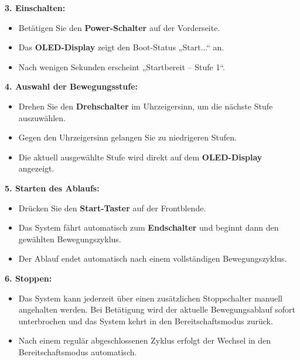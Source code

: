 \documentclass[a4paper,12pt]{report}
\begin{document}
		
		
		\noindent\textbf{3. Einschalten:}
		
		\begin{itemize}[leftmargin=1.5em]
		\item Betätigen Sie den \textbf{Power-Schalter} auf der Vorderseite. 
		\item Das \textbf{OLED-Display} zeigt den Boot-Status „Start...“ an. 
		\item Nach wenigen Sekunden erscheint „Startbereit – Stufe 1“. \\
    	\end{itemize}
		
		\noindent\textbf{4. Auswahl der Bewegungsstufe:}
		\begin{itemize}[leftmargin=1.5em]
		
		\item Drehen Sie den \textbf{Drehschalter} im Uhrzeigersinn, um die nächste Stufe auszuwählen. 
		\item Gegen den Uhrzeigersinn gelangen Sie zu niedrigeren Stufen. 
		\item Die aktuell ausgewählte Stufe wird direkt auf dem \textbf{OLED-Display} angezeigt. \\
    	\end{itemize}
		
		\noindent\textbf{5. Starten des Ablaufs:}
		\begin{itemize}[leftmargin=1.5em]
		
		\item Drücken Sie den \textbf{Start-Taster} auf der Frontblende. 
		\item Das System fährt automatisch zum \textbf{Endschalter} und beginnt dann den gewählten Bewegungszyklus. 
		\item Der Ablauf endet automatisch nach einem vollständigen Bewegungszyklus. \\
    	\end{itemize}
		
		\noindent\textbf{6. Stoppen:}
		\begin{itemize}[leftmargin=1.5em]
		
		\item Das System kann jederzeit über einen zusätzlichen Stoppschalter manuell angehalten werden. Bei Betätigung wird der aktuelle Bewegungsablauf sofort unterbrochen und das System kehrt in den Bereitschaftsmodus zurück.	
		\item Nach einem regulär abgeschlossenen Zyklus erfolgt der Wechsel in den Bereitschaftsmodus automatisch.

		
    	\end{itemize}
    \newpage
	
\end{document}
